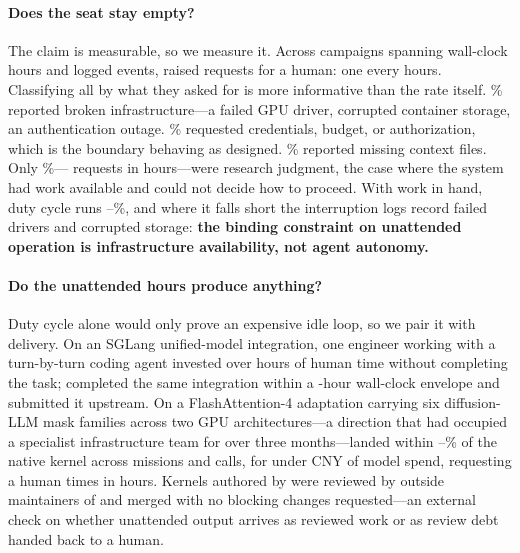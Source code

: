 \paragraph{Does the seat stay empty?}
The claim is measurable, so we measure it. Across \DutyCampaigns{} campaigns
spanning \DutyWallHours{} wall-clock hours and \DutyEvents{} logged events,
\systemname raised \DutyInterruptions{} requests for a human: one every
\DutyInterval{} hours. Classifying all \DutyInterruptions{} by what they asked for is
more informative than the rate itself. \DutyInfraPercent\% reported broken
infrastructure---a failed GPU driver, corrupted container storage, an authentication
outage. \DutyAuthorityPercent\% requested credentials, budget, or authorization,
which is the boundary behaving as designed. \DutyContextPercent\% reported missing
context files. Only \DutyJudgmentPercent\%---\DutyJudgmentCount{} requests in
\DutyWallHours{} hours---were research judgment, the case where the system had work
available and could not decide how to proceed. With work in hand, duty cycle runs
\DutyCycleLow--\DutyCycleHigh\%, and where it falls short the interruption logs
record failed drivers and corrupted storage: \textbf{the binding constraint on
unattended operation is infrastructure availability, not agent autonomy.}

\paragraph{Do the unattended hours produce anything?}
Duty cycle alone would only prove an expensive idle loop, so we pair it with
delivery. On an SGLang unified-model integration, one engineer working with a
turn-by-turn coding agent invested over \SGLangHumanHours{} hours of human time
without completing the task; \systemname completed the same integration within a
\SGLangArgusHours{}-hour wall-clock envelope and submitted it upstream. On a
FlashAttention-4 adaptation carrying six diffusion-LLM mask families across two GPU
architectures---a direction that had occupied a specialist infrastructure team for
over three months---\systemname landed within \FlashDAGapLow--\FlashDAGapHigh\% of
the native kernel across \FlashDAMissions{} missions and \FlashDACalls{} calls, for
under \FlashDACostCNY{} CNY of model spend, requesting a human
\FlashDAInterrupts{} times in \FlashDASpan{} hours. Kernels authored by
\systemname{} were reviewed by outside maintainers of 
and merged with no blocking changes requested---an external check on whether
unattended output arrives as reviewed work or as review debt handed back to a human.

